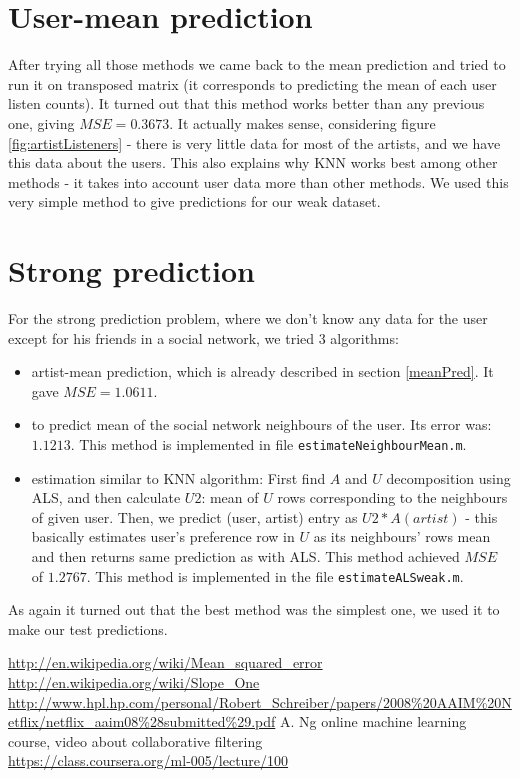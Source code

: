 \documentclass{report}
\begin{document}
\section{User-mean prediction}
After trying all those methods we came back to the mean prediction and tried to run it on transposed matrix (it corresponds to predicting the mean of each user listen counts). It turned out that this method works better than any previous one, giving $MSE=0.3673$. It actually makes sense, considering figure \ref{fig:artistListeners} - there is very little data for most of the artists, and we have this data about the users. This also explains why KNN works best among other methods - it takes into account user data more than other methods. We used this very simple method to give predictions for our weak dataset.

\section{Strong prediction}
For the strong prediction problem, where we don't know any data for the user except for his friends in a social network, we tried $3$ algorithms:
\begin{itemize}
\item artist-mean prediction, which is already described in section \ref{meanPred}. It gave $MSE=1.0611$.
\item to predict mean of the social network neighbours of the user. Its error was: $1.1213$. This method is implemented in file \texttt{estimateNeighbourMean.m}.
\item estimation similar to KNN algorithm: First find $A$ and $U$ decomposition using ALS, and then calculate $U2$: mean of $U$ rows corresponding to the neighbours of given user. Then, we predict (user, artist) entry as $U2 * A(artist)$ - this basically estimates user's preference row in $U$ as its neighbours' rows mean and then returns same prediction as with ALS. This method achieved $MSE$ of $1.2767$. This method is implemented in the file \texttt{estimateALSweak.m}.
\end{itemize}

As again it turned out that the best method was the simplest one, we used it to make our test predictions.

\begingroup
\renewcommand{\cleardoublepage}{}
\renewcommand{\clearpage}{}
\begin{thebibliography}{9}

  \url{http://en.wikipedia.org/wiki/Mean_squared_error}
  \url{http://en.wikipedia.org/wiki/Slope_One}
  \url{http://www.hpl.hp.com/personal/Robert_Schreiber/papers/2008\%20AAIM\%20Netflix/netflix_aaim08\%28submitted\%29.pdf}
   A. Ng online machine learning course,
   video about collaborative filtering\\
  \url{https://class.coursera.org/ml-005/lecture/100}


\end{thebibliography}
\endgroup
\end{document}
